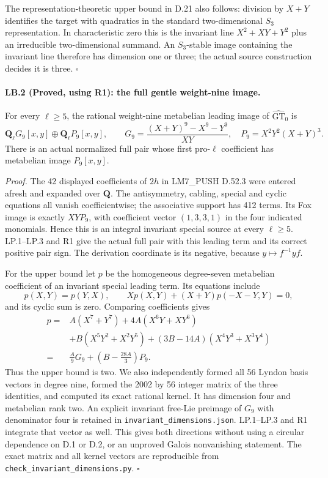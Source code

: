 The representation-theoretic upper bound in D.21 also follows:
division by $X+Y$ identifies the target with quadratics in the
standard two-dimensional $S_3$ representation. In characteristic
zero this is the invariant line $X^2+XY+Y^2$ plus an irreducible
two-dimensional summand. An $S_3$-stable image containing the
invariant line therefore has dimension one or three; the actual
source construction decides it is three. \hfill$\square$

\paragraph{LB.2 (Proved, using R1): the full gentle weight-nine image.}
For every $\ell\geq5$, the rational weight-nine metabelian leading
image of $\widehat{\mathrm{GT}}_0$ is
\[
 \mathbf Q_\ell G_9[x,y]\oplus\mathbf Q_\ell P_9[x,y],
 \qquad G_9=\frac{(X+Y)^9-X^9-Y^9}{XY},\quad
 P_9=X^2Y^2(X+Y)^3.
\]
There is an actual normalized full pair whose first pro-$\ell$
coefficient has metabelian image $P_9[x,y]$.

\emph{Proof.}
The 42 displayed coefficients of $2h$ in LM7\_PUSH D.52.3
were entered afresh and expanded over $\mathbf Q$. The
antisymmetry, cabling, special and cyclic equations all vanish
coefficientwise; the associative support has 412 terms. Its Fox
image is exactly $XY P_9$, with coefficient vector $(1,3,3,1)$
in the four indicated monomials. Hence this is an integral
invariant special source at every $\ell\geq5$. LP.1--LP.3 and
R1 give the actual full pair with this leading term and its
correct positive pair sign. The derivation coordinate is its
negative, because $y\mapsto f^{-1}yf$.

For the upper bound let $p$ be the homogeneous degree-seven
metabelian coefficient of an invariant special leading term.
Its equations include
\[
 p(X,Y)=p(Y,X),\qquad
 Xp(X,Y)+(X+Y)p(-X-Y,Y)=0,
\]
and its cyclic sum is zero. Comparing coefficients gives
\[
\begin{split}
p={}&A(X^7+Y^7)+4A(X^6Y+XY^6)\\
   &+B(X^5Y^2+X^2Y^5)+(3B-14A)(X^4Y^3+X^3Y^4)\\
 ={}&\frac A9G_9+\left(B-\frac{28A}{3}\right)P_9.
\end{split}
\]
Thus the upper bound is two. We also independently formed all
56 Lyndon basis vectors in degree nine, formed the 2002 by 56
integer matrix of the three identities, and computed its exact
rational kernel. It has dimension four and metabelian rank two.
An explicit invariant free-Lie preimage of $G_9$ with denominator
four is retained in \texttt{invariant\_dimensions.json}. LP.1--LP.3
and R1 integrate that vector as well. This gives both directions
without using a circular dependence on D.1 or D.2, or an unproved
Galois nonvanishing statement. The exact matrix and all kernel
vectors are reproducible from \texttt{check\_invariant\_dimensions.py}.
\hfill$\square$

